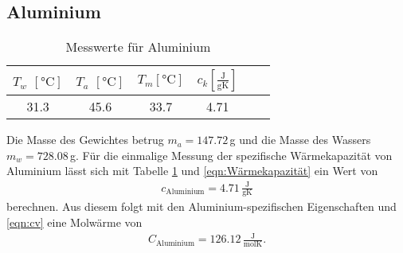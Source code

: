 \subsection{Aluminium}
\begin{table}
  \centering
  \caption{Messwerte für Aluminium}
  \begin{tabular}{c c c c c c}
    \toprule
    $T_w$ $[\si{\degreeCelsius}]$ & $T_a$ $[\si{\degreeCelsius}]$ & $T_m$$[\si{\degreeCelsius}]$ &$c_k[\frac{\text{J}}{\text{gK}}]$ \\
    \midrule
     31.3 & 45.6 & 33.7 & 4.71\\
    \bottomrule
  \end{tabular}
  \label{fig:aluminium}
\end{table}
Die Masse des Gewichtes betrug $m_a=147.72$\,g und die Masse des Wassers $m_w=728.08$\,g.
Für die einmalige Messung der spezifische Wärmekapazität von Aluminium lässt sich mit Tabelle \ref{fig:aluminium}
und \ref{eqn:Wärmekapazität} ein Wert von
\begin{align*}
  c_{\text{Aluminium}} = 4.71\, \frac{\text{J}}{\text{gK}}
\end{align*}
berechnen. Aus diesem folgt mit den Aluminium-spezifischen Eigenschaften und \ref{eqn:cv} eine Molwärme von
\begin{align*}
  C_{\text{Aluminium}} = 126.12 \, \frac{\text{J}}{\text{molK}}.
\end{align*}

